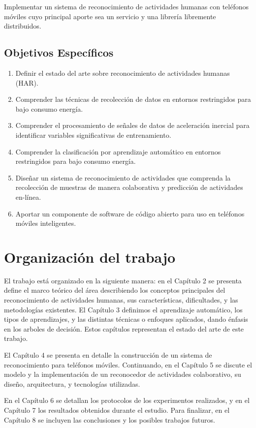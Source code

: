 \label{objetivo-general}

Implementar un sistema de reconocimiento de actividades humanas con
teléfonos móviles cuyo principal aporte sea un servicio y una librería
libremente distribuidos.

\subsection{Objetivos Específicos}

\label{objetivos-especuxedficos}
\begin{enumerate}
\item \label{enu:obe1}Definir el estado del arte sobre reconocimiento de
actividades humanas (HAR). 
\item \label{enu:obe2}Comprender las técnicas de recolección de datos en
entornos restringidos para bajo consumo energía. 
\item \label{enu:obe3}Comprender el procesamiento de señales de datos de
aceleración inercial para identificar variables significativas de
entrenamiento. 
\item \label{enu:obe4}Comprender la clasificación por aprendizaje automático
en entornos restringidos para bajo consumo energía. 
\item \label{enu:obe5}Diseñar un sistema de reconocimiento de actividades
que comprenda la recolección de muestras de manera colaborativa y
predicción de actividades en-línea. 
\item \label{enu:obe6}Aportar un componente de software de código abierto
para uso en teléfonos móviles inteligentes. 
\end{enumerate}

\section{Organización del trabajo}

\label{organizaciuxf3n-del-trabajo}

El trabajo está organizado en la siguiente manera: en el Capítulo
2 se presenta define el marco teórico del área describiendo los conceptos
principales del reconocimiento de actividades humanas, sus características,
dificultades, y las metodologías existentes. El Capítulo 3 definimos
el aprendizaje automático, los tipos de aprendizajes, y las distintas
técnicas o enfoques aplicados, dando énfasis en los arboles de decisión.
Estos capítulos representan el estado del arte de este trabajo.

El Capítulo 4 se presenta en detalle la construcción de un sistema
de reconocimiento para teléfonos móviles. Continuando, en el Capítulo
5 se discute el modelo y la implementación de un reconocedor de actividades
colaborativo, su diseño, arquitectura, y tecnologías utilizadas.

En el Capítulo 6 se detallan los protocolos de los experimentos realizados,
y en el Capítulo 7 los resultados obtenidos durante el estudio. Para
finalizar, en el Capítulo 8 se incluyen las conclusiones y los posibles
trabajos futuros. 
